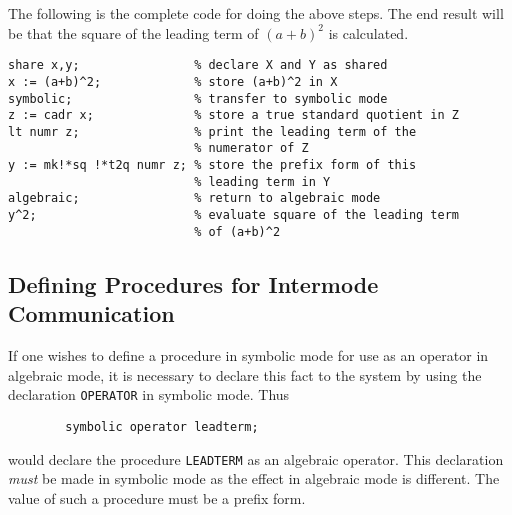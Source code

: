 The following is the complete code for doing the above steps. The end
result will be that the square of the leading term of $(a+b)^{2}$ is
calculated.

\begin{verbatim}
share x,y;                % declare X and Y as shared
x := (a+b)^2;             % store (a+b)^2 in X
symbolic;                 % transfer to symbolic mode
z := cadr x;              % store a true standard quotient in Z
lt numr z;                % print the leading term of the
                          % numerator of Z
y := mk!*sq !*t2q numr z; % store the prefix form of this
                          % leading term in Y
algebraic;                % return to algebraic mode
y^2;                      % evaluate square of the leading term
                          % of (a+b)^2
\end{verbatim}

\subsection{Defining Procedures for Intermode Communication}

If one wishes to define a procedure in symbolic mode for use as an
operator in algebraic mode, it is necessary to declare this fact to the
system by using the declaration {\tt OPERATOR} in
symbolic mode. Thus
\begin{verbatim}
        symbolic operator leadterm;
\end{verbatim}
would declare the procedure {\tt LEADTERM} as an algebraic operator. This
declaration {\em must\/} be made in symbolic mode as the effect in algebraic
mode is different.  The value of such a procedure must be a prefix form.

